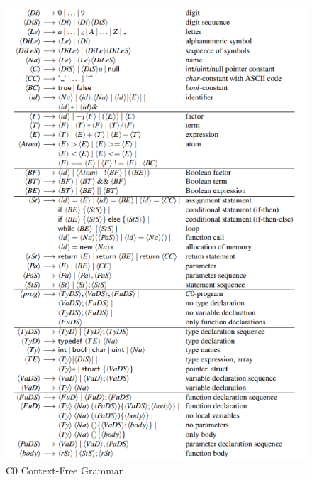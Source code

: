 \begin{figure}[h!]
    \center
    \includegraphics[width=13cm]{C0.png}
    \caption{C0 Context-Free Grammar}
    \label{fig:grammar_c0}
\end{figure}